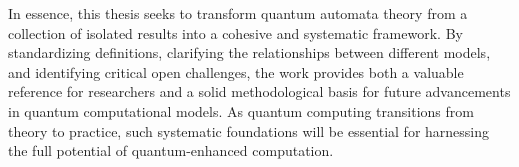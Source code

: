 In essence, this thesis seeks to transform quantum automata theory from a collection of isolated results into a cohesive and systematic framework. By standardizing definitions, clarifying the relationships between different models, and identifying critical open challenges, the work provides both a valuable reference for researchers and a solid methodological basis for future advancements in quantum computational models. As quantum computing transitions from theory to practice, such systematic foundations will be essential for harnessing the full potential of quantum-enhanced computation.